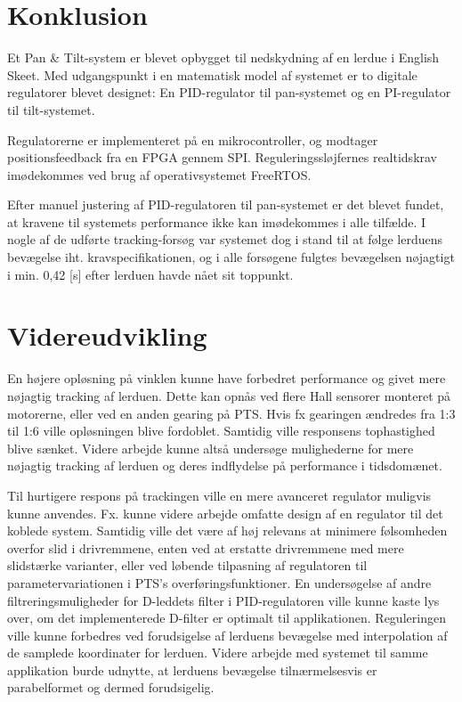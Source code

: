 \section{Konklusion}
\label{sec:konklusion}
Et Pan \& Tilt-system er blevet opbygget til nedskydning af en lerdue i English Skeet.
Med udgangspunkt i en matematisk model af systemet er to digitale regulatorer
blevet designet: En PID-regulator til pan-systemet og en PI-regulator til tilt-systemet.

Regulatorerne er implementeret på en mikrocontroller, og modtager positionsfeedback
fra en FPGA gennem SPI.
Reguleringssløjfernes realtidskrav imødekommes ved brug af operativsystemet FreeRTOS.

Efter manuel justering af PID-regulatoren til pan-systemet er det blevet fundet,
at kravene til systemets performance ikke kan imødekommes i alle tilfælde.
I nogle af de udførte tracking-forsøg var systemet dog i stand til at følge lerduens bevægelse
iht. kravspecifikationen,
og i alle forsøgene fulgtes bevægelsen nøjagtigt i min. 0,42 [s] efter lerduen havde nået sit toppunkt.

\section{Videreudvikling}
En højere opløsning på vinklen kunne have forbedret performance og givet mere nøjagtig tracking af lerduen.
Dette kan opnås ved flere Hall sensorer monteret på motorerne, eller ved en anden gearing på PTS.
Hvis fx gearingen ændredes fra 1:3 til 1:6 ville opløsningen blive fordoblet. Samtidig ville responsens tophastighed
blive sænket. Videre arbejde kunne altså undersøge mulighederne for mere nøjagtig tracking af lerduen og deres
indflydelse på performance i tidsdomænet.

Til hurtigere respons på trackingen ville en mere avanceret regulator muligvis kunne anvendes.
Fx. kunne videre arbejde omfatte design af en regulator til det koblede system.
Samtidig ville det være af høj relevans at minimere følsomheden overfor slid i drivremmene,
enten ved at erstatte drivremmene med mere slidstærke varianter, eller ved løbende tilpasning
af regulatoren til parametervariationen i PTS's overføringsfunktioner.
En undersøgelse af andre filtreringsmuligheder for D-leddets filter i PID-regulatoren ville kunne kaste
lys over, om det implementerede D-filter er optimalt til applikationen.
Reguleringen ville kunne forbedres ved forudsigelse af lerduens bevægelse med interpolation
af de samplede koordinater for lerduen.
Videre arbejde med systemet til samme applikation burde udnytte,
at lerduens bevægelse tilnærmelsesvis er parabelformet og dermed forudsigelig.